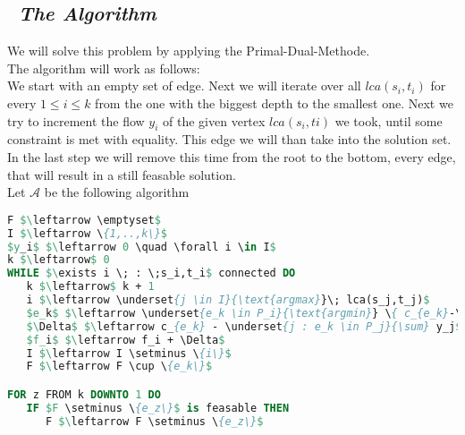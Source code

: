 \subsection*{\itshape~The Algorithm}

We will solve this problem by applying the Primal-Dual-Methode.\\

The algorithm will work as follows:\\
We start with an empty set of edge. Next we will iterate over all $lca(s_i,t_i)$ for every $1 \leq i \leq k$
from the one with the biggest depth to the smallest one. Next we try to increment the flow $y_i$
of the given vertex $lca(s_i,ti)$ we took, until some constraint is met with equality. This edge
we will than take into the solution set. In the last step we will remove this time from the root to the
bottom, every edge, that will result in a still feasable solution.\\

Let $\mathcal{A}$ be the following algorithm\\

\begin{lstlisting}[language=Pascal]
F $\leftarrow \emptyset$
I $\leftarrow \{1,..,k\}$
$y_i$ $\leftarrow 0 \quad \forall i \in I$
k $\leftarrow$ 0
WHILE $\exists i \; : \;s_i,t_i$ connected DO
   k $\leftarrow$ k + 1
   i $\leftarrow \underset{j \in I}{\text{argmax}}\; lca(s_j,t_j)$
   $e_k$ $\leftarrow \underset{e_k \in P_i}{\text{argmin}} \{ c_{e_k}-\underset{j:e_k\in P_j}{\sum} y_j\}$
   $\Delta$ $\leftarrow c_{e_k} - \underset{j : e_k \in P_j}{\sum} y_j$
   $f_i$ $\leftarrow f_i + \Delta$
   I $\leftarrow I \setminus \{i\}$
   F $\leftarrow F \cup \{e_k\}$

FOR z FROM k DOWNTO 1 DO
   IF $F \setminus \{e_z\}$ is feasable THEN
      F $\leftarrow F \setminus \{e_z\}$
\end{lstlisting}
